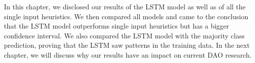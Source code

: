 In this chapter, we disclosed our results of the LSTM model as well as of all the single input heuristics. We then compared all models and came to the conclusion that the LSTM model outperforms single input heuristics but has a bigger confidence interval. We also compared the LSTM model with the majority class prediction, proving that the LSTM saw patterns in the training data.
In the next chapter, we will discuss why our results have an impact on current DAO research.
